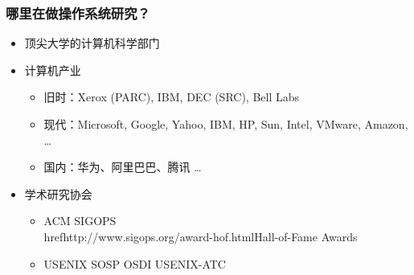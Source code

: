    
\begin{frame}
    \frametitle{哪里在做操作系统研究？}
    \begin{itemize}
        \item 顶尖大学的计算机科学部门
        \item 计算机产业
        \begin{itemize}
            \item 旧时：Xerox (PARC), IBM, DEC (SRC), Bell Labs
            \item 现代：Microsoft, Google, Yahoo, IBM, HP, Sun, Intel, VMware, Amazon,  …
            \item 国内：华为、阿里巴巴、腾讯 …
        \end{itemize}

        \item 学术研究协会
        \begin{itemize}
            \item ACM SIGOPS \\href{http://www.sigops.org/award-hof.html}{Hall-of-Fame Awards} 
            \item USENIX SOSP OSDI  USENIX-ATC
        \end{itemize}
    \end{itemize}
\end{frame}




